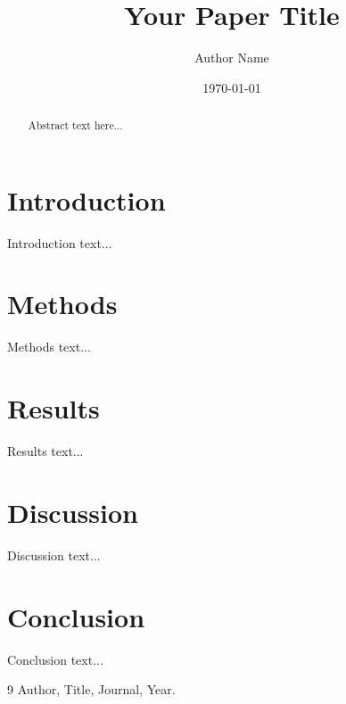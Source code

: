 \documentclass[12pt]{article}
\title{Your Paper Title}
\author{Author Name}
\date{\today}
\begin{document}
\maketitle

\begin{abstract}
Abstract text here...
\end{abstract}

\section{Introduction}
Introduction text...

\section{Methods}
Methods text...

\section{Results}
Results text...

\section{Discussion}
Discussion text...

\section{Conclusion}
Conclusion text...

\begin{thebibliography}{9}
 Author, Title, Journal, Year.
\end{thebibliography}
\end{document}
